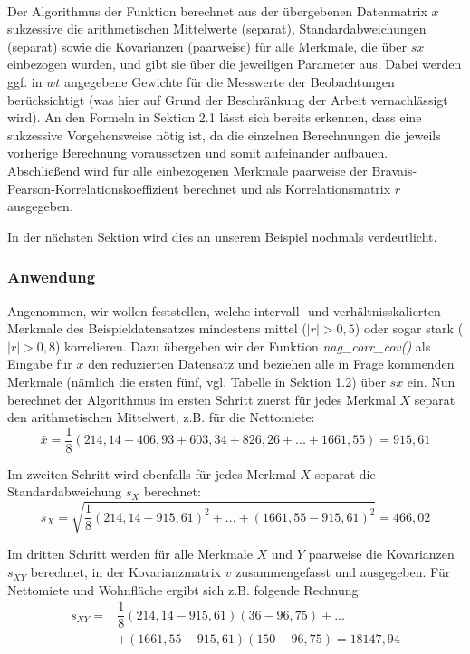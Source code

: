 \\

\noindent Der Algorithmus der Funktion berechnet aus der übergebenen Datenmatrix $x$ sukzessive die arithmetischen Mittelwerte (separat), Standardabweichungen (separat) sowie die Kovarianzen (paarweise) für alle Merkmale, die über $sx$ einbezogen wurden, und gibt sie über die jeweiligen Parameter aus. Dabei werden ggf. in $wt$ angegebene Gewichte für die Messwerte der Beobachtungen berücksichtigt (was hier auf Grund der Beschränkung der Arbeit vernachlässigt wird). An den Formeln in Sektion 2.1 lässt sich bereits erkennen, dass eine sukzessive Vorgehensweise nötig ist, da die einzelnen Berechnungen die jeweils vorherige Berechnung voraussetzen und somit aufeinander aufbauen. Abschließend wird für alle einbezogenen Merkmale paarweise der Bravais-Pearson-Korrelationskoeffizient berechnet und als Korrelationsmatrix $r$ ausgegeben.

In der nächsten Sektion wird dies an unserem Beispiel nochmals verdeutlicht.

\subsubsection{Anwendung}

Angenommen, wir wollen feststellen, welche intervall- und verhältnisskalierten Merkmale des Beispieldatensatzes mindestens mittel ($|r|>0,5$) oder sogar stark ($|r|>0,8$) korrelieren. Dazu übergeben wir der Funktion {\it nag\_corr\_cov()} als Eingabe für $x$ den reduzierten Datensatz und beziehen alle in Frage kommenden Merkmale (nämlich die ersten fünf, vgl. Tabelle in Sektion 1.2) über $sx$ ein. Nun berechnet der Algorithmus im ersten Schritt zuerst für jedes Merkmal $X$ separat den arithmetischen Mittelwert, z.B. für die Nettomiete:
\begin{equation*}
	\bar{x}=\dfrac{1}{8}(214,14+406,93+603,34+826,26+...+1661,55)=915,61
\end{equation*}

\noindent Im zweiten Schritt wird ebenfalls für jedes Merkmal $X$ separat die Standardabweichung $s_X$ berechnet:
\begin{equation*}
	s_X=\sqrt{\dfrac{1}{8}(214,14-915,61)^2+...+(1661,55-915,61)^2}=466,02
\end{equation*}

\noindent Im dritten Schritt werden für alle Merkmale $X$ und $Y$ paarweise die Kovarianzen $s_{XY}$ berechnet, in der Kovarianzmatrix $v$ zusammengefasst und ausgegeben. Für Nettomiete und Wohnfläche ergibt sich z.B. folgende Rechnung:
\begin{equation*}
	\begin{split}
		s_{XY}=& \dfrac{1}{8}(214,14-915,61)(36-96,75)+...\\
		& +(1661,55-915,61)(150-96,75)=18147,94
	\end{split}
\end{equation*}

